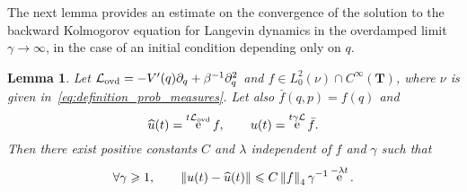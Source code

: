 \documentclass[11pt,a4paper]{article}
\DeclareMathOperator{\e}{e}
\newcommand{\torus}{\mathbf T}
\theoremstyle{plain}
\newtheorem{lemma}{Lemma}[section]
\numberwithin{equation}{section}
\renewcommand{\leq}{\leqslant}
\renewcommand{\geq}{\geqslant}
\begin{document}
The next lemma provides an estimate on the convergence of the solution to the backward Kolmogorov equation for Langevin dynamics
in the overdamped limit $\gamma \to \infty$,
in the case of an initial condition depending only on $q$.
\begin{lemma}
    \label{lemma:backward_kolmogorov_obs_q}
    Let $\mathcal L_{\rm ovd} = - V'(q) \partial_q + \beta^{-1} \partial_q^2$ and $f \in L^2_0(\nu) \cap C^{\infty}(\torus)$,
    where $\nu$ is given in~\eqref{eq:definition_prob_measures}.
    Let also $\bar f(q, p) = f(q)$ and
    \[
        \widehat u(t) = \e^{t\mathcal L_{\rm ovd}} f, \qquad
        u(t) = \e^{t \gamma\mathcal L} \bar f.
    \]
    Then there exist positive constants $C$ and $\lambda$ independent of $f$ and $\gamma$ such that
    \[
        \forall \gamma \geq 1, \qquad
        \norm{u(t)  - \widehat u(t)} \leq
        C \norm{f}_4 \gamma^{-1} \e^{-\lambda t}.
    \]
\end{lemma}
\end{document}
